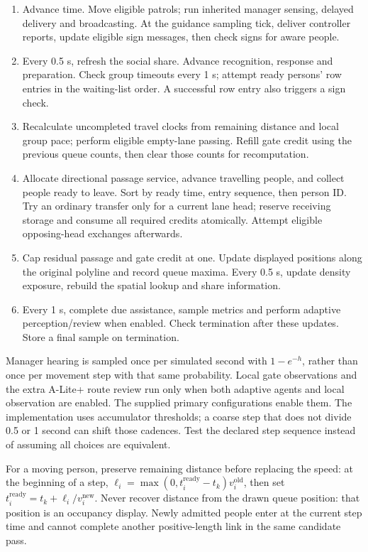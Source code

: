 \documentclass[11pt,a4paper]{article}
\begin{document}
\begin{enumerate}[label=\arabic*.]
\item Advance time. Move eligible patrols; run inherited manager sensing, delayed delivery and broadcasting. At the guidance sampling tick, deliver controller reports, update eligible sign messages, then check signs for aware people.
\item Every 0.5 s, refresh the social share. Advance recognition, response and preparation. Check group timeouts every 1 s; attempt ready persons' row entries in the waiting-list order. A successful row entry also triggers a sign check.
\item Recalculate uncompleted travel clocks from remaining distance and local group pace; perform eligible empty-lane passing. Refill gate credit using the previous queue counts, then clear those counts for recomputation.
\item Allocate directional passage service, advance travelling people, and collect people ready to leave. Sort by ready time, entry sequence, then person ID. Try an ordinary transfer only for a current lane head; reserve receiving storage and consume all required credits atomically. Attempt eligible opposing-head exchanges afterwards.
\item Cap residual passage and gate credit at one. Update displayed positions along the original polyline and record queue maxima. Every 0.5 s, update density exposure, rebuild the spatial lookup and share information.
\item Every 1 s, complete due assistance, sample metrics and perform adaptive perception/review when enabled. Check termination after these updates. Store a final sample on termination.
\end{enumerate}

Manager hearing is sampled once per simulated second with $1-e^{-h}$, rather than once per movement step with that same probability. Local gate observations and the extra A-Lite+ route review run only when both adaptive agents and local observation are enabled. The supplied primary configurations enable them. The implementation uses accumulator thresholds; a coarse step that does not divide 0.5 or 1 second can shift those cadences. Test the declared step sequence instead of assuming all choices are equivalent.

For a moving person, preserve remaining distance before replacing the speed: at the beginning of a step, $\ell_i=\max(0,t_i^{\mathrm{ready}}-t_k)v_i^{\mathrm{old}}$, then set $t_i^{\mathrm{ready}}=t_k+\ell_i/v_i^{\mathrm{new}}$. Never recover distance from the drawn queue position: that position is an occupancy display. Newly admitted people enter at the current step time and cannot complete another positive-length link in the same candidate pass.
\end{document}
